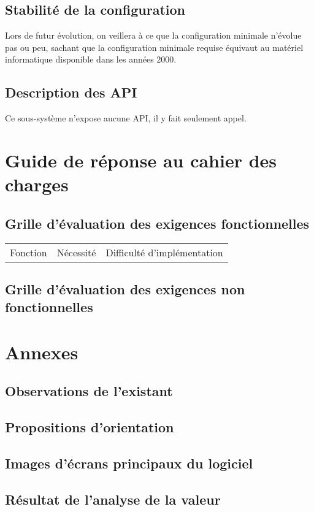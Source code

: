 \subsection{Stabilité de la configuration}
Lors de futur évolution, on veillera à ce que la configuration minimale n'évolue pas ou peu, sachant que la configuration minimale requise équivaut au matériel informatique disponible dans les années 2000.

\subsection{Description des API}
Ce sous-système n'expose aucune API, il y fait seulement appel.

\section{Guide de réponse au cahier des charges}
\subsection{Grille d'évaluation des exigences fonctionnelles}
\begin{tabular}{|c|c|c|}
	\hline Fonction & Nécessité & Difficulté d'implémentation
\end{tabular}
\subsection{Grille d'évaluation des exigences non fonctionnelles}

\section{Annexes}
\subsection{Observations de l'existant}
\subsection{Propositions d'orientation}
\subsection{Images d'écrans principaux du logiciel}
\subsection{Résultat de l'analyse de la valeur}